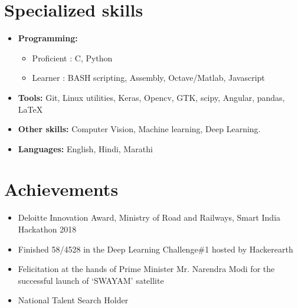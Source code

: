 \documentclass[10pt,a4paper,sans]{moderncv}        %
\begin{document}
\section{Specialized skills}

\vspace{5pt}

\begin{itemize}

\item \textbf{Programming:} 
	\begin{itemize}
			\item Proficient : C, Python
			\item Learner : BASH scripting, Assembly, Octave/Matlab, Javascript %
	\end{itemize}

\vspace{3pt}

\item \textbf{Tools:} Git, Linux utilities, Keras, Opencv, GTK, scipy, Angular, pandas, \LaTeX %

\vspace{3pt}

\item \textbf{Other skills:} Computer Vision, Machine learning, Deep Learning. %

\vspace{3pt}

\item \textbf{Languages:} English, Hindi, Marathi

\end{itemize}

\section{Achievements}

\vspace{3pt}

\begin{itemize}

\item{Deloitte Innovation Award, Ministry of Road and Railways, Smart India Hackathon 2018}
\item{Finished 58/4528 in the Deep Learning Challenge\#1 hosted by Hackerearth}
\item{Felicitation at the hands of Prime Minister Mr. Narendra Modi for the successful launch of `SWAYAM' satellite}

\item{National Talent Search Holder}




\end{itemize}
\end{document}
